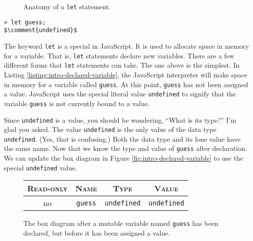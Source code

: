 \begin{figure}
  
  \caption{Anatomy of a \texttt{let} statement.}
\end{figure}

\reactivatelinenumbers
\begin{lstlisting}[caption={\label{listing:intro-declared-variable} The NodeJS syntax to create a mutable variable named \texttt{guess}. The result is a value whose box diagram is \ref{fig:intro-declared-variable}.}, escapeinside=$$]
> let guess;
$\comment{undefined}$
\end{lstlisting}
\suppresslinenumbers

The keyword \texttt{let} is a special in JavaScript. It is used to allocate space in memory for a variable. That is, \texttt{let} statements declare new variables. There are a few different forms that \texttt{let} statements can take. The one above is the simplest. In Listing \ref{listing:intro-declared-variable}, the JavaScript interpreter will make space in memory for a variable called \texttt{guess}. At this point, \texttt{guess} has not been assigned a value. JavaScript uses the special literal value \texttt{undefined} to signify that the variable \texttt{guess} is not currently bound to a value.

Since \texttt{undefined} is a value, you should be wondering, ``What is its type?'' I'm glad you asked. The value \texttt{undefined} is the only value of the data type \texttt{undefined}. (Yes, that is confusing.) Both the data type and its lone value have the same name. Now that we know the type and value of \texttt{guess} after declaration. We can update the box diagram in Figure \ref{fig:intro-declared-variable} to use the special \texttt{undefined} value.

\begin{figure}[h]
  \sffamily
  \color{cyan}
  \begin{tabular}{|c|c|c|c|}
    \hline
    \textsc{Read-only} & \textsc{Name} & \textsc{Type} & \textsc{Value}\\
    \hline
    no & \texttt{guess} & \texttt{undefined} & \texttt{undefined}\\
    \hline
  \end{tabular}
  \caption{\label{fig:intro-undefined-variable} The box diagram after a mutable variable named \texttt{guess} has been declared, but before it has been assigned a value.}
\end{figure}


